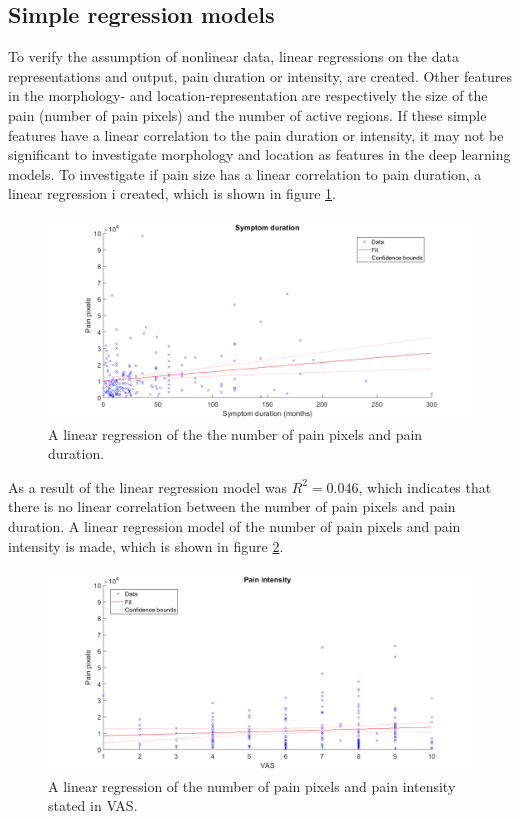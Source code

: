 \subsection{Simple regression models}
To verify the assumption of nonlinear data, linear regressions on the data representations and output, pain duration or intensity, are created. 
Other features in the morphology- and location-representation are respectively the size of the pain (number of pain pixels) and the number of active regions. If these simple features have a linear correlation to the pain duration or intensity,  it may not be significant to investigate morphology and location as features in the deep learning models. \newline
\noindent
To investigate if pain size has a linear correlation to pain duration, a linear regression i created, which is shown in figure \ref{fig:durationRegression}.
\newline

\begin{figure} [H]
\centering
\includegraphics[width=1\textwidth]{figures/durationRegression}
\caption{A linear regression of the the number of pain pixels and pain duration.}
\label{fig:durationRegression}
\end{figure}

\noindent
As a result of the linear regression model was $R^2=0.046$, which indicates that there is no linear correlation between the number of pain pixels and pain duration.\newline
\noindent
A linear regression model of the number of pain pixels and pain intensity is made, which is shown in figure \ref{fig:painRegression}. \newline

\begin{figure} [H]
\centering
\includegraphics[width=1\textwidth]{figures/painRegression}
\caption{A linear regression of the number of pain pixels and pain intensity stated in VAS.}
\label{fig:painRegression}
\end{figure}

